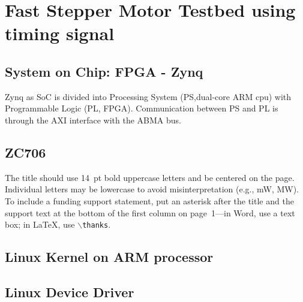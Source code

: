 \documentclass[a4paper,
              ]{jacow}
\begin{document}
\section{Fast Stepper Motor Testbed using timing signal}

\subsection{System on Chip: FPGA - Zynq}
Zynq\cite{xilix,zynq} as SoC is divided into Processing System (PS,dual-core ARM cpu) with  Programmable Logic (PL, FPGA). Communication between PS and PL is through the AXI interface with the ABMA bus.

\subsection{ZC706}
The title should use \SI{14}{pt} bold uppercase letters and be centered on the page.
Individual letters may be lowercase to avoid misinterpretation (e.g., mW, MW).
To include a funding support statement, put an asterisk after the title and
the support text at the bottom of the first column on page~1---in Word,
use a text box; in \LaTeX, use $\backslash$\texttt{thanks}.

\subsection{Linux Kernel on ARM processor}
\subsection{Linux Device Driver}
\end{document}
